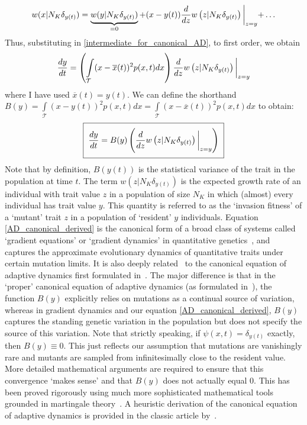 \begin{equation*}
    w(x|N_K\delta_{y(t)}) = \underbrace{w(y|N_K\delta_{y(t)})}_{=0} + (x-y(t))\frac{d}{dz}w\left(z|N_K\delta_{y(t)}\right)\biggl{|}_{z=y} + \ldots
\end{equation*}
Thus, substituting in \eqref{intermediate_for_canonical_AD}, to first order, we obtain
\begin{equation*}
    \frac{dy}{dt} = \left(\int\limits_{\mathcal{T}}(x-\overline{x}(t))^2p(x,t)dx\right)\frac{d}{dz}w\left(z|N_K\delta_{y(t)}\right)\biggl{|}_{z=y}
\end{equation*}
where I have used $\overline{x}(t) = y(t)$. We can define the shorthand $B(y) =\int\limits_{\mathcal{T}}(x-y(t))^2p(x,t)dx = \int\limits_{\mathcal{T}}(x-\overline{x}(t))^2p(x,t)dx$ to obtain:
\begin{equation}
    \label{AD_canonical_derived}
    \setlength{\fboxsep}{2\fboxsep}\boxed{\frac{dy}{dt} = B(y)\left(\frac{d}{dz}w\left(z|N_K\delta_{y(t)}\right)\biggl{|}_{z=y}\right)}
\end{equation}
Note that by definition, $B(y(t))$ is the statistical variance of the trait in the population at time $t$. The term $w\left(z|N_K\delta_{y(t)}\right)$ is the expected growth rate of an individual with trait value $z$ in a population of size $N_K$ in which (almost) every individual has trait value $y$. This quantity is referred to as the `invasion fitness' of a `mutant' trait $z$ in a population of `resident' $y$ individuals. Equation \eqref{AD_canonical_derived} is the canonical form of a broad class of systems called `gradient equations' or `gradient dynamics' in quantitative genetics~\citep{lande_quantitative_1982, abrams_relationship_1993, lehtonen_price_2018, lion_theoretical_2018}, and captures the approximate evolutionary dynamics of quantitative traits under certain mutation limits.  It is also deeply related~\citep{lehtonen_price_2018, lion_theoretical_2018} to the canonical equation of adaptive dynamics first formulated in~\cite{dieckmann_dynamical_1996}. The major difference is that in the `proper' canonical equation of adaptive dynamics (as formulated in~\cite{dieckmann_dynamical_1996}), the function $B(y)$ explicitly relies on mutations as a continual source of variation, whereas in gradient dynamics and our equation \eqref{AD_canonical_derived}, $B(y)$ captures the standing genetic variation in the population but does not specify the source of this variation. Note that strictly speaking, if $\psi(x,t) = \delta_{y(t)}$ exactly, then $B(y) \equiv 0$. This just reflects our assumption that mutations are vanishingly rare and mutants are sampled from infinitesimally close to the resident value. More detailed mathematical arguments are required to ensure that this convergence `makes sense' and that $B(y)$ does not actually equal 0. This has been proved rigorously using much more sophisticated mathematical tools grounded in martingale theory~\citep{champagnat_unifying_2006}. A heuristic derivation of the canonical equation of adaptive dynamics is provided in the classic article by~\cite{dieckmann_dynamical_1996}.

